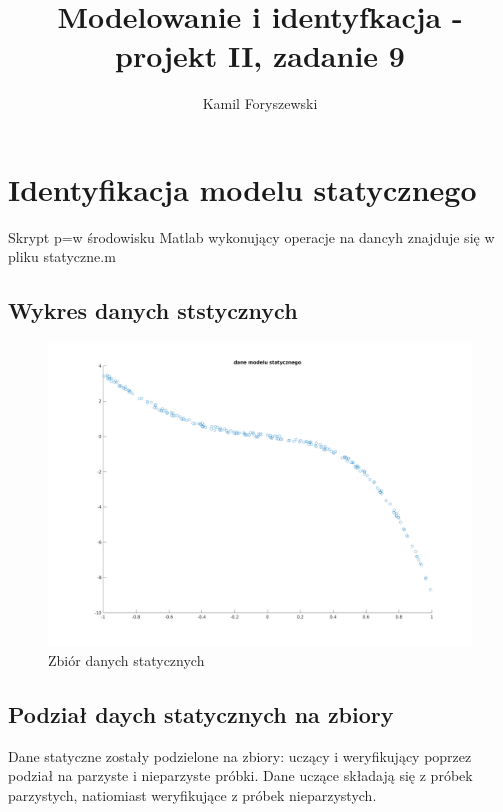 \documentclass[a4paper, 11pt]{article}
\author{Kamil Foryszewski}
\title{Modelowanie i identyfkacja - projekt II, zadanie 9}
\begin{document}

\maketitle
\tableofcontents

\section{Identyfikacja modelu statycznego}
Skrypt p=w środowisku Matlab wykonujący operacje na dancyh znajduje się w pliku statyczne.m
\subsection{Wykres danych ststycznych}
\begin{figure}[H]
\centering
\includegraphics[scale=0.5]{dane_stat.png}
\caption{Zbiór danych statycznych}
\label{}
\end{figure}
\subsection{Podział daych statycznych na zbiory}
Dane statyczne zostały podzielone na zbiory: uczący i weryfikujący poprzez podział na parzyste i nieparzyste próbki. Dane uczące składają się z próbek parzystych, natiomiast weryfikujące z próbek nieparzystych. 
\end{document}
